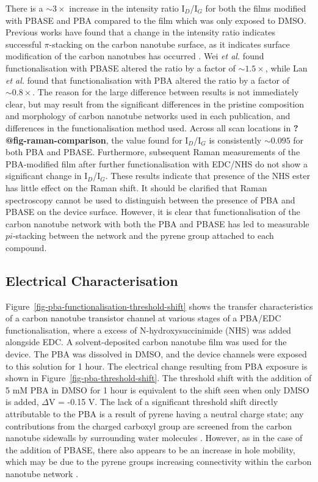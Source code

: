 \documentclass[
  a4paper,
]{scrbook}
\begin{document}
There is a \(\sim 3 \times\) increase in the intensity ratio
I\(_D\)/I\(_G\) for both the films modified with PBASE and PBA compared
to the film which was only exposed to DMSO. Previous works have found
that a change in the intensity ratio indicates successful
\(\pi\)-stacking on the carbon nanotube surface, as it indicates surface
modification of the carbon nanotubes has occurred
\autocite{Wei2010,Lan2013}. Wei \emph{et al.} \autocite{Wei2010} found
functionalisation with PBASE altered the ratio by a factor of
\(\sim 1.5 \times\), while Lan \emph{et al.} \autocite{Lan2013} found
that functionalisation with PBA altered the ratio by a factor of
\(\sim 0.8 \times\). The reason for the large difference between results
is not immediately clear, but may result from the significant
differences in the pristine composition and morphology of carbon
nanotube networks used in each publication, and differences in the
functionalisation method used. Across all scan locations in
\textbf{?@fig-raman-comparison}, the value found for I\(_D\)/I\(_G\) is
consistently \(\sim 0.095\) for both PBA and PBASE. Furthermore,
subsequent Raman measurements of the PBA-modified film after further
functionalisation with EDC/NHS do not show a significant change in
I\(_D\)/I\(_G\). These results indicate that presence of the NHS ester
has little effect on the Raman shift. It should be clarified that Raman
spectroscopy cannot be used to distinguish between the presence of PBA
and PBASE on the device surface. However, it is clear that
functionalisation of the carbon nanotube network with both the PBA and
PBASE has led to measurable \(pi\)-stacking between the network and the
pyrene group attached to each compound.

\hypertarget{sec-PBA-characterisation}{%
\subsection{Electrical
Characterisation}\label{sec-PBA-characterisation}}

Figure~\ref{fig-pba-functionalisation-threshold-shift} shows the
transfer characteristics of a carbon nanotube transistor channel at
various stages of a PBA/EDC functionalisation, where a excess of
N-hydroxysuccinimide (NHS) was added alongside EDC. A solvent-deposited
carbon nanotube film was used for the device. The PBA was dissolved in
DMSO, and the device channels were exposed to this solution for 1 hour.
The electrical change resulting from PBA exposure is shown in
Figure~\ref{fig-pba-threshold-shift}. The threshold shift with the
addition of 5 mM PBA in DMSO for 1 hour is equivalent to the shift seen
when only DMSO is added, \(\Delta\)V = -0.15 V. The lack of a
significant threshold shift directly attributable to the PBA is a result
of pyrene having a neutral charge state; any contributions from the
charged carboxyl group are screened from the carbon nanotube sidewalls
by surrounding water molecules \autocite{Lerner2012}. However, as in the
case of the addition of PBASE, there also appears to be an increase in
hole mobility, which may be due to the pyrene groups increasing
connectivity within the carbon nanotube network
\autocite{Murugathas2019b}.
\end{document}
